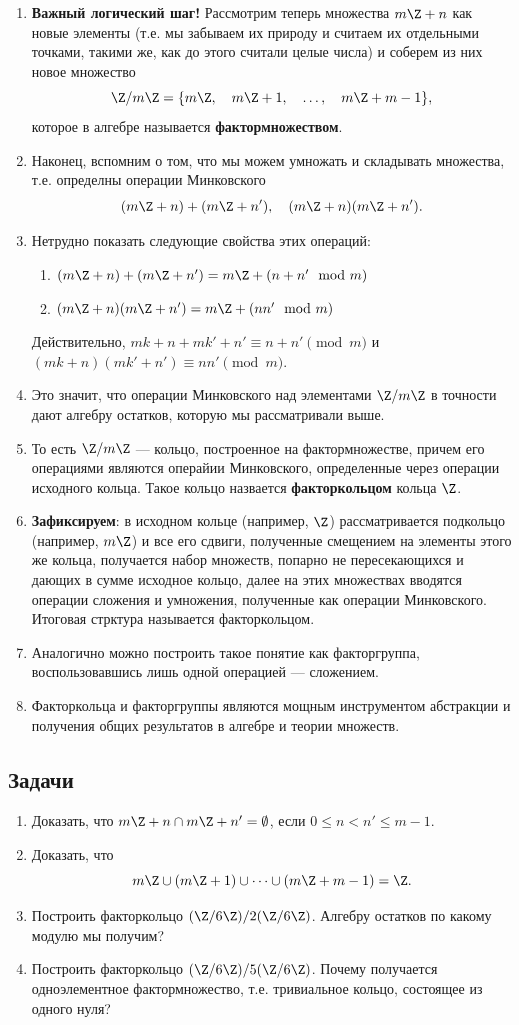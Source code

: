 {\begin{enumerate}
\item \textbf{Важный логический шаг!} Рассмотрим теперь множества $m\Z+n$ как новые элементы (т.е. мы забываем их природу и считаем их отдельными точками, такими же, как до этого считали целые числа) и соберем из них новое множество
$$
\Z/m\Z = \{m\Z,\quad m\Z+1,\quad\dots,\quad m\Z+m-1\},
$$
которое в алгебре называется \textbf{фактормножеством}.
\item Наконец, вспомним о том, что мы можем умножать и складывать множества, т.е. определны операции Минковского
$$
(m\Z+n)+(m\Z+n'),\quad (m\Z+n)(m\Z+n').
$$
\item Нетрудно показать следующие свойства этих операций:
\begin{enumerate}[Z1]
\item $(m\Z+n)+(m\Z+n') = m\Z+(n+n'\mod m)$
\item $(m\Z+n)(m\Z+n') = m\Z+(nn'\mod m)$
\end{enumerate}
Действительно, $mk+n+mk'+n'\equiv n+n'\pmod m$ и $(mk+n)(mk'+n')\equiv nn'\pmod m$.
\item Это значит, что операции Минковского над элементами $\Z/m\Z$ в точности дают алгебру остатков, которую мы рассматривали выше.
\item То есть $\Z/m\Z$ --- кольцо, построенное на фактормножестве, причем его операциями являются операйии Минковского, определенные через операции исходного кольца. Такое кольцо назвается \textbf{факторкольцом} кольца $\Z$.
\item \textbf{Зафиксируем}: в исходном кольце (например, $\Z$) рассматривается подкольцо (например, $m\Z$) и все его сдвиги, полученные смещением на элементы этого же кольца, получается набор множеств, попарно не пересекающихся и дающих в сумме исходное кольцо, далее на этих множествах вводятся операции сложения и умножения, полученные как операции Минковского. Итоговая стрктура называется факторкольцом.
\item Аналогично можно построить такое понятие как факторгруппа, воспользовавшись лишь одной операцией --- сложением.
\item Факторкольца и факторгруппы являются мощным инструментом абстракции и получения общих результатов в алгебре и теории множеств.
\end{enumerate}


\subsection*{Задачи}
\begin{enumerate}
\item Доказать, что $m\Z+n\cap m\Z+n'=\emptyset$, если $0\le n<n'\le m-1$.
\item Доказать, что
$$
m\Z\cup (m\Z+1)\cup\dots\cup (m\Z+m-1) = \Z.
$$
\item Построить факторкольцо $(\Z/6\Z)/2(\Z/6\Z)$. Алгебру остатков по какому модулю мы получим?
\item Построить факторкольцо $(\Z/6\Z)/5(\Z/6\Z)$. Почему получается одноэлементное фактормножество, т.е. тривиальное кольцо, состоящее из одного нуля?
\end{enumerate}
}


